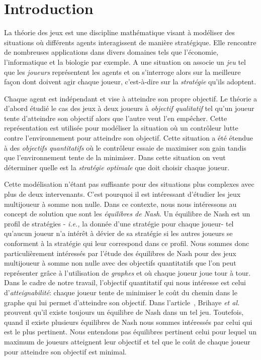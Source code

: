 
\section{Introduction}

La théorie des jeux est une discipline mathématique visant à modéliser des situations où différents agents interagissent de manière stratégique. Elle rencontre de nombreuses applications dans divers domaines tels que l'économie, l'informatique et la biologie par exemple.
A une situation on associe un \emph{jeu} tel que les \emph{joueurs} représentent les agents et on s'interroge alors sur la meilleure façon dont doivent agir chaque joueur, c'est-à-dire sur la \emph{stratégie} qu'ils adoptent.

Chaque agent est indépendant et vise à atteindre son propre objectif. Le théorie a d'abord étudié le cas des jeux à deux joueurs à \emph{objectif qualitatif} tel qu'un joueur tente d'atteindre son objectif alors que l'autre veut l'en empêcher. Cette représentation est utilisée pour modéliser la situation où un contrôleur lutte contre l'environnement pour atteindre son objectif. Cette situation a été étendue à des \emph{objectifs quantitatifs} où le contrôleur essaie de maximiser son gain tandis que l'environnement tente de la minimiser. Dans cette situation on veut déterminer quelle est la \emph{stratégie optimale} que doit choisir chaque joueur.

Cette modélisation n'étant pas suffisante pour des situations plus complexes avec plus de deux intervenants. C'est pourquoi il est intéressant d'étudier les jeux multijoueur à somme non nulle. Dans ce contexte, nous nous intéressons au concept de solution que sont les \emph{équilibres de Nash}. Un équilibre de Nash est un profil de stratégies - \emph{i.e.,} la donnée d'une stratégie pour chaque joueur- tel qu'aucun joueur n'a intérêt à dévier de sa stratégie si les autres joueurs se conforment à la stratégie qui leur correspond dans ce profil.
Nous sommes donc particulièrement intéressés par l'étude des équilibres de Nash pour des jeux multijoueur à somme non nulle avec des objectifs quantitatifs que l'on peut représenter grâce à l'utilisation de \emph{graphes} et où chaque joueur joue tour à tour.\\


Dans le cadre de notre travail, l'objectif quantitatif qui nous intéresse est celui d'\emph{atteignabilité}: chaque joueur tente de minimiser le coût du chemin dans le graphe qui lui permet d'atteindre son objectif. Dans l'article~\cite{DBLP:conf/lfcs/BrihayePS13}, Brihaye \emph{et al.} prouvent qu'il existe toujours un équilibre de Nash dans un tel jeu. Toutefois, quand il existe plusieurs équilibres de Nash nous sommes intéressés par celui qui est le plus pertinent. Nous entendons pas équilibres pertinent  celui pour lequel un maximum de joueurs atteignent leur objectif et tel que le coût de chaque joueur pour atteindre son objectif est minimal.

